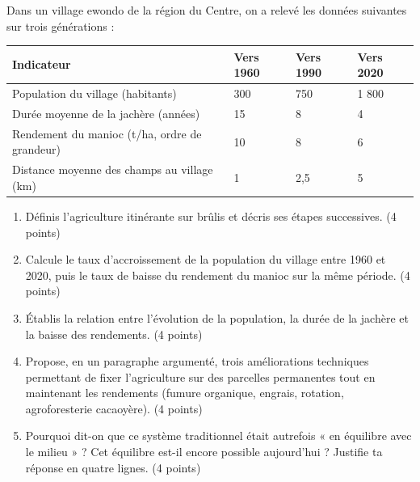 \documentclass[11pt]{article}
\begin{document}
\begin{exercice}
Dans un village ewondo de la région du Centre, on a relevé les données suivantes sur trois générations :

\begin{center}
\begin{tabularx}{\linewidth}{|l|X|X|X|}\hline
\rowcolor{popblueL} Indicateur & Vers 1960 & Vers 1990 & Vers 2020 \\ \hline
Population du village (habitants) & 300 & 750 & 1 800 \\ \hline
Durée moyenne de la jachère (années) & 15 & 8 & 4 \\ \hline
Rendement du manioc (t/ha, ordre de grandeur) & 10 & 8 & 6 \\ \hline
Distance moyenne des champs au village (km) & 1 & 2,5 & 5 \\ \hline
\end{tabularx}
\end{center}

\begin{enumerate}
\item Définis l'agriculture itinérante sur brûlis et décris ses étapes successives. (4 points)
\item Calcule le taux d'accroissement de la population du village entre 1960 et 2020, puis le taux de baisse du rendement du manioc sur la même période. (4 points)
\item Établis la relation entre l'évolution de la population, la durée de la jachère et la baisse des rendements. (4 points)
\item Propose, en un paragraphe argumenté, trois améliorations techniques permettant de fixer l'agriculture sur des parcelles permanentes tout en maintenant les rendements (fumure organique, engrais, rotation, agroforesterie cacaoyère). (4 points)
\item Pourquoi dit-on que ce système traditionnel était autrefois « en équilibre avec le milieu » ? Cet équilibre est-il encore possible aujourd'hui ? Justifie ta réponse en quatre lignes. (4 points)
\end{enumerate}
\end{exercice}
\end{document}
